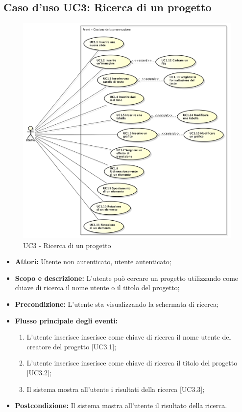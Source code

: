 \newpage
\subsection{Caso d'uso UC3: Ricerca di un progetto}
\begin{figure}[h] 
	\centering 
	\includegraphics[scale=0.45] {img/UC3.png} 
	\caption{UC3 - Ricerca di un progetto} 
\end{figure}

\begin{itemize}
	\item \textbf{Attori:} Utente non autenticato, utente autenticato;
	\item \textbf{Scopo e descrizione:} L'utente può cercare un progetto utilizzando come chiave di ricerca il nome utente o il titolo del progetto;
	\item \textbf{Precondizione:} L'utente sta visualizzando la schermata di ricerca;
	\item \textbf{Flusso principale degli eventi:}
	\begin{enumerate}
		\item L'utente inserisce inserisce come chiave di ricerca il nome utente del creatore del progetto [UC3.1];
		\item L'utente inserisce inserisce come chiave di ricerca il titolo del progetto [UC3.2];
		\item Il sistema mostra all'utente i risultati della ricerca [UC3.3];
	\end{enumerate}
	\item \textbf{Postcondizione:} Il sistema mostra all'utente il risultato della ricerca.
\end{itemize}

